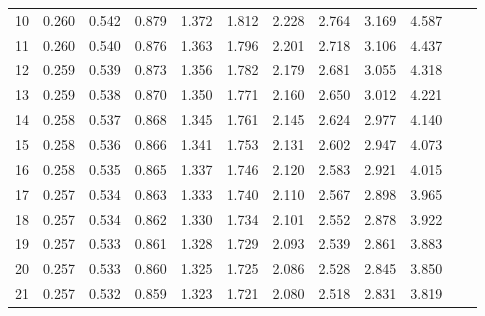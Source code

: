 \begin{table}[!htbp]
\begin{tabularx}{\linewidth}{@{}BYZYZYZYZYZY@{}}
            10            & 0.260        & 0.542        & 0.879        & 1.372        & 1.812         & 2.228          & 2.764         & 3.169          & 4.587           \\
            11            & 0.260        & 0.540        & 0.876        & 1.363        & 1.796         & 2.201          & 2.718         & 3.106          & 4.437           \\
            12            & 0.259        & 0.539        & 0.873        & 1.356        & 1.782         & 2.179          & 2.681         & 3.055          & 4.318           \\
            13            & 0.259        & 0.538        & 0.870        & 1.350        & 1.771         & 2.160          & 2.650         & 3.012          & 4.221           \\
            14            & 0.258        & 0.537        & 0.868        & 1.345        & 1.761         & 2.145          & 2.624         & 2.977          & 4.140           \\
            15            & 0.258        & 0.536        & 0.866        & 1.341        & 1.753         & 2.131          & 2.602         & 2.947          & 4.073           \\
            16            & 0.258        & 0.535        & 0.865        & 1.337        & 1.746         & 2.120          & 2.583         & 2.921          & 4.015           \\
            17            & 0.257        & 0.534        & 0.863        & 1.333        & 1.740         & 2.110          & 2.567         & 2.898          & 3.965           \\
            18            & 0.257        & 0.534        & 0.862        & 1.330        & 1.734         & 2.101          & 2.552         & 2.878          & 3.922           \\
            19            & 0.257        & 0.533        & 0.861        & 1.328        & 1.729         & 2.093          & 2.539         & 2.861          & 3.883           \\
            20            & 0.257        & 0.533        & 0.860        & 1.325        & 1.725         & 2.086          & 2.528         & 2.845          & 3.850           \\
            21            & 0.257        & 0.532        & 0.859        & 1.323        & 1.721         & 2.080          & 2.518         & 2.831          & 3.819           \\

\end{tabularx}
\end{table}
